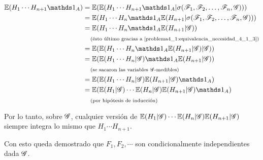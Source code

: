 \begin{itemize}
        \begin{align}
            \E(H_1 \cdots H_{n+1} \indic_A)     &=  \E(\E(H_1 \cdots H_{n+1} \indic_A | \sigma(\F_1, \F_2, \dots, \F_n, \G)))               \\
                                                    &=  \E(H_1 \cdots H_n \indic_A \E(H_{n+1}  | \sigma(\F_1, \F_2, \dots, \F_n, \G)))      \\
                                                    &=  \E(H_1 \cdots H_n \indic_A \E(H_{n+1}  | \G))                                       \\
                                                    &\comment{ésto último gracias a \eqref{problema4_1:equivalencia_necesidad_4_1_3}}       \\
                                                    &=  \E(\E(H_1 \cdots H_n \indic_A \E(H_{n+1}  | \G) | \G))                              \\
                                                    &=  \E(\E(H_1 \cdots H_n | \G) \indic_A \E(H_{n+1}  | \G))                              \\
                                                    &\comment{se sacaron las variables $\G$-medibles}                                       \\
                                                    &=  \E(\E(H_1 \cdots H_n | \G) \E(H_{n+1} | \G) \indic_A)                               \\
                                                    &=  \E(\E(H_1 | \G) \cdots \E(H_n | \G) \E(H_{n+1} | \G) \indic_A)                      \\
                                                    &\comment{por hipótesis de inducción}                                              
        \end{align}
            
        Por lo tanto, sobre $\mathscr{G}$, cualquier versión de $\mathbb{E}(H_1 | \mathscr{G}) \cdots \mathbb{E}(H_n | \mathscr{G}) \mathbb{E}(H_{n+1} | \mathscr{G})$ siempre integra lo mismo que 
        $H_1 \cdots H_{n+1}$.\pn
\end{itemize}

Con esto queda demostrado que $F_1, F_2, \cdots$ son condicionalmente independientes dada $\mathscr{G}$.